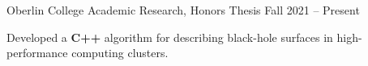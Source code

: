 \begin{entry}{Oberlin College}
	\entryItem
		{Academic Research, Honors Thesis}
		{Fall 2021 -- Present}
		
		\begin{items}
			\item Developed a \textbf{C++} algorithm for describing black-hole surfaces in high-performance computing clusters.
		\end{items}
\end{entry}
